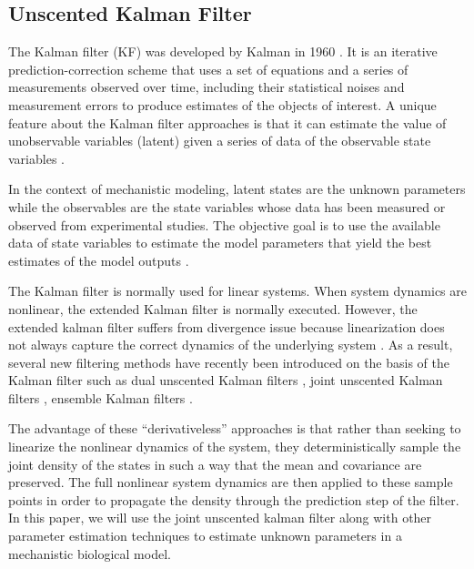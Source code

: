 \documentclass[review]{elsarticle}
\begin{document}
\tableofcontents

\linenumbers


\subsection{Unscented Kalman Filter}\label{UKF}

The Kalman filter (KF) was developed by Kalman in 1960 \cite{kalman1960new}. It is an iterative prediction-correction scheme that 
uses a set of equations and a series of measurements observed over time, including their statistical noises and measurement errors to produce estimates of the objects of interest. A unique feature about the Kalman filter approaches is that it can estimate the value of unobservable variables (latent) given a series of data of the observable state variables \cite{GoveHollingerDual}.

In the context of mechanistic modeling, latent states 
are the unknown parameters while the observables are the state variables whose data has been measured or observed from experimental studies. The objective goal is to use the available data of state variables to estimate the model parameters that yield the best estimates of the model outputs \cite{albers2017personalized}. 


The Kalman filter is normally used for linear systems. When system dynamics are nonlinear, the extended Kalman filter is normally executed. However, the extended kalman filter suffers from divergence issue \cite{fitzgerald1971divergence} because linearization does not always capture the correct dynamics of the underlying system \cite{maybeck1982stochastic}. As a result, several new filtering methods have recently been introduced on the basis of the Kalman filter such as dual unscented Kalman filters \cite{VanMereChapter,GoveHollingerDual}, joint unscented Kalman filters \cite{VanMereChapter,ChowFerrer}, ensemble Kalman filters \cite{evensen2003ensemble,evensen2003ensemble}. 

The advantage of these ``derivativeless'' approaches is that rather than seeking to linearize the nonlinear dynamics of the system, they deterministically sample the joint density of the states in such a way that the mean and covariance are preserved. The full nonlinear system dynamics are then applied to these sample points in order to propagate the density through the prediction step of the filter. In this paper, we will use the joint unscented kalman filter along with other parameter estimation techniques to estimate unknown parameters in a mechanistic biological model. 
\end{document}
